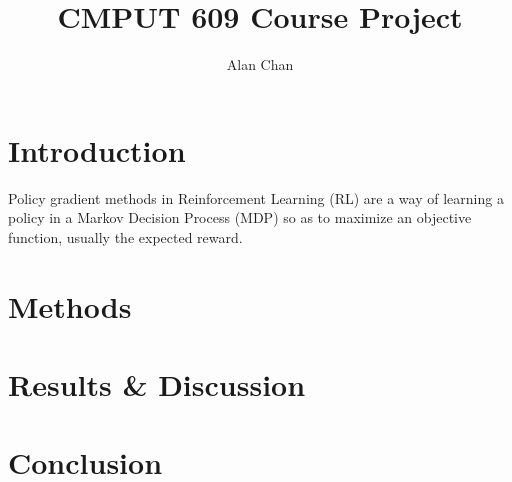 \documentclass{article}
\title{CMPUT 609 Course Project}
\author{Alan Chan}
\date{}
\begin{document}
  \maketitle

  \section{Introduction}
  Policy gradient methods in Reinforcement Learning (RL) are a way of learning a policy in a Markov Decision Process (MDP) so as to maximize an objective function, usually the expected reward. 

  \section{Methods}

  \section{Results & Discussion}

  \section{Conclusion}
\end{document}
